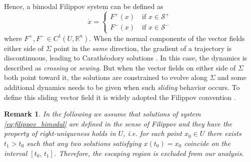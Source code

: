 \documentclass[letterpaper, 10 pt, conference]{ieeeconf}
\newtheorem{remark}{Remark}
\begin{document}
Hence, a bimodal Filippov system can be defined as
\begin{equation}
\label{eq:filippov_bimodal}
\dot{x}=
\begin{cases}
F^+(x) \quad \mbox{if } x\in\mathcal{S}^+ \\
F^-(x) \quad \mbox{if } x\in\mathcal{S}^-
\end{cases}
\end{equation}
where $F^+,F^-\in{C}^1(U,\mathbb{R}^n)$.  When the normal components of the vector fields either side of $\Sigma$ point in the \textit{same} direction, the gradient of a trajectory is discontinuous, leading to Carath\'eodory solutions \cite{filippov1988differential}. In this case, the dynamics is described as \textit{crossing} or \textit{sewing}. But when the vector fields on either side of $\Sigma$ both point toward it, the solutions are constrained to evolve along $\Sigma$ and some additional dynamics needs to be given when such \emph{sliding} behavior occurs. To define this sliding vector field it is widely adopted the Filippov convention \cite{filippov1988differential}. 
\begin{remark}
In the following we assume that solutions of system \eqref{eq:filippov_bimodal} are defined in the sense of Filippov \cite{filippov1988differential} and they have the property of \emph{right-uniqueness} \cite[pag. 106]{filippov1988differential} holds in $U$, i.e. for each point $x_0\in U$ there exists $t_1>t_0$ such that any two solutions satisfying $x(t_0)=x_0$ coincide on the interval $[t_0,\, t_1]$. Therefore, the escaping region is excluded from our analysis. 
\end{remark}
\end{document}
